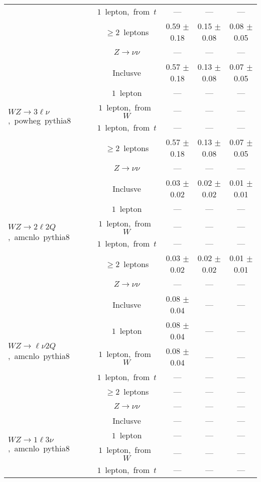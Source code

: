 \documentclass{article}
\begin{document}
\begin{longtable}{|l|c|c|c|c|}
 & $1$~lepton,~from~$t$  & ---  & ---  & --- \\* 
 & $\ge2$~leptons  & 0.59 $\pm$ 0.18  & 0.15 $\pm$ 0.08  & 0.08 $\pm$ 0.05 \\* 
 & $Z\rightarrow\nu\nu$  & ---  & ---  & --- \\* 
\hline 
\multirow{6}{*}{$WZ{\rightarrow}3\ell\nu$,~powheg~pythia8} & Inclusve  & 0.57 $\pm$ 0.18  & 0.13 $\pm$ 0.08  & 0.07 $\pm$ 0.05 \\* 
 & $1$~lepton  & ---  & ---  & --- \\* 
 & $1$~lepton,~from~$W$  & ---  & ---  & --- \\* 
 & $1$~lepton,~from~$t$  & ---  & ---  & --- \\* 
 & $\ge2$~leptons  & 0.57 $\pm$ 0.18  & 0.13 $\pm$ 0.08  & 0.07 $\pm$ 0.05 \\* 
 & $Z\rightarrow\nu\nu$  & ---  & ---  & --- \\* 
\hline 
\multirow{6}{*}{$WZ{\rightarrow}2{\ell}2Q$,~amcnlo~pythia8} & Inclusve  & 0.03 $\pm$ 0.02  & 0.02 $\pm$ 0.02  & 0.01 $\pm$ 0.01 \\* 
 & $1$~lepton  & ---  & ---  & --- \\* 
 & $1$~lepton,~from~$W$  & ---  & ---  & --- \\* 
 & $1$~lepton,~from~$t$  & ---  & ---  & --- \\* 
 & $\ge2$~leptons  & 0.03 $\pm$ 0.02  & 0.02 $\pm$ 0.02  & 0.01 $\pm$ 0.01 \\* 
 & $Z\rightarrow\nu\nu$  & ---  & ---  & --- \\* 
\hline 
\multirow{6}{*}{$WZ{\rightarrow}{\ell}{\nu}2Q$,~amcnlo~pythia8} & Inclusve  & 0.08 $\pm$ 0.04  & ---  & --- \\* 
 & $1$~lepton  & 0.08 $\pm$ 0.04  & ---  & --- \\* 
 & $1$~lepton,~from~$W$  & 0.08 $\pm$ 0.04  & ---  & --- \\* 
 & $1$~lepton,~from~$t$  & ---  & ---  & --- \\* 
 & $\ge2$~leptons  & ---  & ---  & --- \\* 
 & $Z\rightarrow\nu\nu$  & ---  & ---  & --- \\* 
\hline 
\multirow{6}{*}{$WZ{\rightarrow}1{\ell}3{\nu}$,~amcnlo~pythia8} & Inclusve  & ---  & ---  & --- \\* 
 & $1$~lepton  & ---  & ---  & --- \\* 
 & $1$~lepton,~from~$W$  & ---  & ---  & --- \\* 
 & $1$~lepton,~from~$t$  & ---  & ---  & --- \\* 

\end{longtable}
\end{document}
